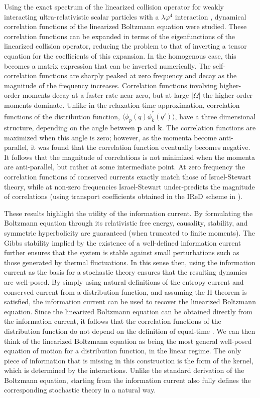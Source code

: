 \documentclass[aps,prd,preprint,nofootinbib,amsmath,amssymb,showpacs,longbibliography,singlecolumn,superscriptaddress,10pt]{revtex4-1}
\theoremstyle{plain}
\theoremstyle{definition}
\begin{document}
Using the exact spectrum of the linearized collision operator for weakly interacting ultra-relativistic scalar particles with a $\lambda \varphi^4$ interaction \cite{Mullins:2022fbx, Denicol:2022bsq, Rocha:2023hts, deBrito:2023vzv}, dynamical correlation functions of the linearized Boltzmann equation were studied. These correlation functions can be expanded in terms of the eigenfunctions of the linearized collision operator, reducing the problem to that of inverting a tensor equation for the coefficients of this expansion. In the homogenous case, this becomes a matrix expression that can be inverted numerically. The self-correlation functions are sharply peaked at zero frequency and decay as the magnitude of the frequency increases. Correlation functions involving higher-order moments decay at a faster rate near zero, but at large $|\Omega|$ the higher order moments dominate. Unlike in the relaxation-time approximation, correlation functions of the distribution function, $\langle \bar{\phi}_p(q) \bar{\phi}_k^*(q') \rangle$, have a three dimensional structure, depending on the angle between $\mathbf{p}$ and $\mathbf{k}$. The correlation functions are maximized when this angle is zero; however, as the momenta become anti-parallel, it was found that the correlation function eventually becomes negative. It follows that the magnitude of correlations is not minimized when the momenta are anti-parallel, but rather at some intermediate point. At zero frequency the correlation functions of conserved currents exactly match those of Israel-Stewart theory, while at non-zero frequencies Israel-Stewart under-predicts the magnitude of correlations (using transport coefficients obtained in the IReD scheme in \cite{Rocha:2023hts}). 

These results highlight the utility of the information current. By formulating the Boltzmann equation through its relativistic free energy, causality, stability, and symmetric hyperbolicity are guaranteed (when truncated to finite moments). The Gibbs stability implied by the existence of a well-defined information current further ensures that the system is stable against small perturbations such as those generated by thermal fluctuations. In this sense then, using the information current as the basis for a stochastic theory ensures that the resulting dynamics are well-posed. By simply using natural definitions of the entropy current and conserved current from a distribution function, and assuming the H-theorem is satisfied, the information current can be used to recover the linearized Boltzmann equation. Since the linearized Boltzmann equation can be obtained directly from the information current, it follows that the correlation functions of the distribution function do not depend on the definition of equal-time \cite{Mullins:2023tjg}. We can then think of the linearized Boltzmann equation as being the most general well-posed equation of motion for a distribution function, in the linear regime. The only piece of information that is missing in this construction is the form of the kernel, which is determined by the interactions. Unlike the standard derivation of the Boltzmann equation, starting from the information current also fully defines the corresponding stochastic theory in a natural way. 
\end{document}
